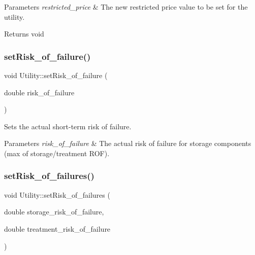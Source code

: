 \begin{DoxyParams}{Parameters}
{\em restricted\+\_\+price} & The new restricted price value to be set for the utility.\\
\hline
\end{DoxyParams}
\begin{DoxyReturn}{Returns}
void 
\end{DoxyReturn}
\mbox{\label{classUtility_a68d5088951f6bdccbb7af18ea8f153f5}} 
\subsubsection{\texorpdfstring{set\+Risk\+\_\+of\+\_\+failure()}{setRisk\_of\_failure()}}
{\footnotesize\ttfamily void Utility\+::set\+Risk\+\_\+of\+\_\+failure (\begin{DoxyParamCaption}\item[{double}]{risk\+\_\+of\+\_\+failure }\end{DoxyParamCaption})}



Sets the actual short-\/term risk of failure. 


\begin{DoxyParams}{Parameters}
{\em risk\+\_\+of\+\_\+failure} & The actual risk of failure for storage components (max of storage/treatment R\+OF). \\
\hline
\end{DoxyParams}
\mbox{\label{classUtility_aadf42161486c8305b0b55aa65c5f519e}} 
\subsubsection{\texorpdfstring{set\+Risk\+\_\+of\+\_\+failures()}{setRisk\_of\_failures()}}
{\footnotesize\ttfamily void Utility\+::set\+Risk\+\_\+of\+\_\+failures (\begin{DoxyParamCaption}\item[{double}]{storage\+\_\+risk\+\_\+of\+\_\+failure,  }\item[{double}]{treatment\+\_\+risk\+\_\+of\+\_\+failure }\end{DoxyParamCaption})}



